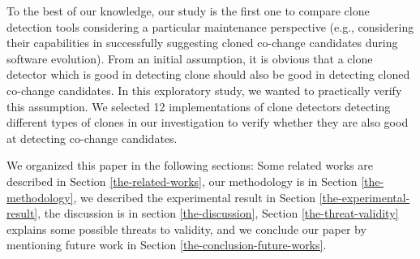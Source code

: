 \documentclass[review]{elsarticle}
\begin{document}
To the best of our knowledge, our study is the first one to compare clone detection tools considering a particular maintenance perspective (e.g., considering their capabilities in successfully suggesting cloned co-change candidates during software evolution). From an initial assumption, it is obvious that a clone detector which is good in detecting clone should also be good in detecting cloned co-change candidates. In this exploratory study, we wanted to practically verify this assumption. We selected 12 implementations of clone detectors detecting different types of clones in our investigation to verify whether they are also good at detecting co-change candidates.

\vspace{0.5mm}
We organized this paper in the following sections: Some related works are described in Section \ref{the-related-works}, our methodology is in Section \ref{the-methodology}, we described the experimental result in Section \ref{the-experimental-result}, the discussion is in section \ref{the-discussion}, Section \ref{the-threat-validity} explains some possible threats to validity, and we conclude our paper by mentioning future work in Section \ref{the-conclusion-future-works}.


\vspace{2mm}
\end{document}
